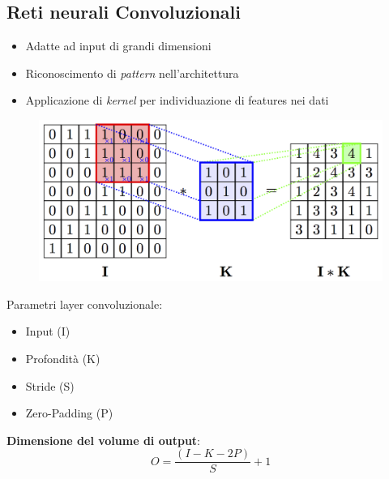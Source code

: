 \documentclass[xcolor=x11names,compress, 
					handout %
]{beamer}
\theoremstyle{definition} \newtheorem{esempio}{Esempio}
\theoremstyle{definition}
\begin{document}
	\subsection{Reti neurali Convoluzionali}
		\begin{frame}{\subsecname}
			\begin{itemize}
				\item Adatte ad input di grandi dimensioni\pause
				\item Riconoscimento di \textit{pattern} nell'architettura\pause
				\item Applicazione di \textit{kernel} per individuazione di features nei dati
			\end{itemize}
			\begin{figure}
				\includegraphics[scale=0.9]{immagini/convolution}
			\end{figure}
		\end{frame}
		\begin{frame}{\subsecname}
			Parametri layer convoluzionale:
			\begin{itemize}
				\item Input (I)
				\item Profondità (K)
				\item Stride (S)
				\item Zero-Padding (P)
			\end{itemize}\pause
			\begin{center}
				\textbf{Dimensione del volume di output}:
				\begin{equation}
					O={\frac{(I - K - 2P)}{S} +1}
				\end{equation}
			\end{center}
		\end{frame}
\end{document}
